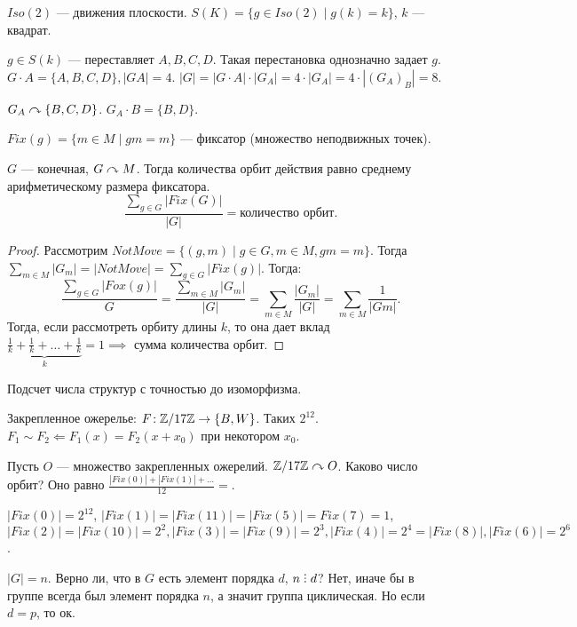 \begin{example}
    $Iso(2)$ --- движения плоскости.  $S(K) = \{g \in Iso(2) \mid g(k) = k\}$,  $k$ --- квадрат.

    $g \in S(k)$ --- переставляет  $A, B, C, D$. Такая перестановка однозначно задает  $g$.
    $G \cdot A = \{A, B, C, D\}, |GA| = 4$.  $|G| = |G \cdot A| \cdot |G_A| = 4 \cdot |G_A| = 4 \cdot |(G_A)_B| = 8$.

     $G_A \curvearrowright \{B,C,D\}$.  $G_A \cdot B = \{B, D\}$.
\end{example}
\begin{definition}
    $Fix(g) = \{m \in M \mid gm = m\}$ --- фиксатор (множество неподвижных точек).
\end{definition}
\begin{theorem}
    $G$ --- конечная,  $G \curvearrowright M$. Тогда количества орбит действия равно среднему арифметическому размера фиксатора.
     \[
    \frac{\sum_{g \in G} |Fix(G)|}{|G|} = \text{количество орбит}
    .\] 
\end{theorem}
\begin{proof}
    Рассмотрим $NotMove = \{(g, m) \mid g \in G, m \in M, gm = m\}$. Тогда  $\sum\limits_{m \in M}|G_m| = |NotMove| = \sum_{g \in G}|Fix(g)|$. Тогда: \[
    \frac{\sum_{g \in G}|Fox(g)|}{G} = \frac{\sum_{m \in M}|G_m|}{|G|} = \sum_{m \in M} \frac{|G_m|}{|G|} = \sum_{m \in M} \frac{1}{|Gm|}
    .\] 
    Тогда, если рассмотреть орбиту длины $k$, то она дает вклад  $\underbrace{\frac{1}{k} + \frac{1}{k} + \ldots + \frac{1}{k}}_{k} = 1 \implies$ сумма количества орбит.
\end{proof}
\begin{example}
    Подсчет числа структур с точностью до изоморфизма. 

    Закрепленное ожерелье: $F\!: \mathbb{Z} / 17\mathbb{Z} \to \{B, W\}$. Таких  $2^{12}$.
     $F_1 \sim F_2 \Leftarrow F_1(x) = F_2(x + x_0)$ при некотором $x_0$.

     Пусть  $O$ --- множество закрепленных ожерелий.  $\mathbb{Z} / 17\mathbb{Z} \curvearrowright O$. Каково число орбит?  Оно равно  $\frac{|Fix(0)| + |Fix(1)| + \ldots}{12} = $.

     $|Fix(0)| = 2^{12}$,  $|Fix(1)| = |Fix(11)| = |Fix(5)| = Fix(7) = 1$,  $|Fix(2)| = |Fix(10)| = 2^2, |Fix(3)| = |Fix(9)| = 2^3, |Fix(4)| = 2^4 = |Fix(8)|, |Fix(6)| = 2^6$.
\end{example}
$|G| = n$. Верно ли, что в  $G$ есть элемент порядка  $d$, $n \divby d$? Нет, иначе  бы в группе всегда был элемент порядка $n$, а значит группа циклическая. Но если $d = p$, то ок.

